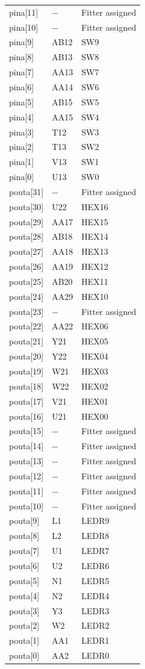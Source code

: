 \documentclass[12pt]{article}
\begin{document}
\begin{longtable}{lll}
pina[11]  & $-$      & Fitter assigned \\
pina[10]  & $-$      & Fitter assigned \\
pina[9]   & AB12     & SW9 \\
pina[8]   & AB13     & SW8 \\
pina[7]   & AA13     & SW7 \\
pina[6]   & AA14     & SW6 \\
pina[5]   & AB15     & SW5 \\
pina[4]   & AA15     & SW4 \\
pina[3]   & T12      & SW3 \\
pina[2]   & T13      & SW2 \\
pina[1]   & V13      & SW1 \\
pina[0]   & U13      & SW0 \\
pouta[31] & $-$      & Fitter assigned \\
pouta[30] & U22      & HEX16 \\
pouta[29] & AA17     & HEX15 \\
pouta[28] & AB18     & HEX14 \\
pouta[27] & AA18     & HEX13 \\
pouta[26] & AA19     & HEX12 \\
pouta[25] & AB20     & HEX11 \\
pouta[24] & AA29     & HEX10 \\
pouta[23] & $-$      & Fitter assigned \\
pouta[22] & AA22     & HEX06 \\
pouta[21] & Y21      & HEX05 \\
pouta[20] & Y22      & HEX04 \\
pouta[19] & W21      & HEX03 \\
pouta[18] & W22      & HEX02 \\
pouta[17] & V21      & HEX01 \\
pouta[16] & U21      & HEX00 \\
pouta[15] & $-$      & Fitter assigned \\
pouta[14] & $-$      & Fitter assigned \\
pouta[13] & $-$      & Fitter assigned \\
pouta[12] & $-$      & Fitter assigned \\
pouta[11] & $-$      & Fitter assigned \\
pouta[10] & $-$      & Fitter assigned \\
pouta[9]  & L1       & LEDR9 \\
pouta[8]  & L2       & LEDR8 \\
pouta[7]  & U1       & LEDR7 \\
pouta[6]  & U2       & LEDR6 \\
pouta[5]  & N1       & LEDR5 \\
pouta[4]  & N2       & LEDR4 \\
pouta[3]  & Y3       & LEDR3 \\
pouta[2]  & W2       & LEDR2 \\
pouta[1]  & AA1      & LEDR1 \\
pouta[0]  & AA2      & LEDR0 \\
\end{longtable}
\end{document}
